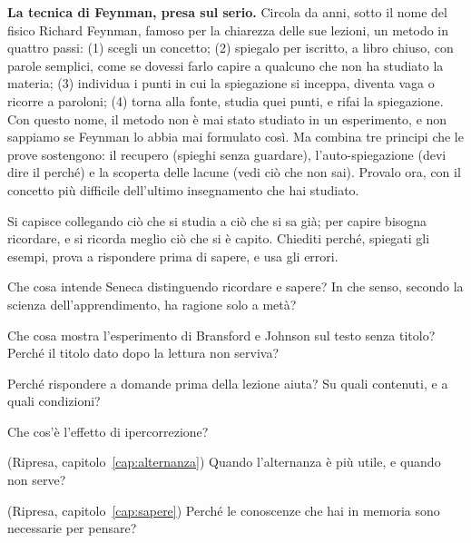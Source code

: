 \begin{esercizio}
\textbf{La tecnica di Feynman, presa sul serio.} Circola da anni, sotto
il nome del fisico Richard Feynman, famoso per la chiarezza delle sue
lezioni, un metodo in quattro passi: (1) scegli un concetto; (2)
spiegalo per iscritto, a libro chiuso, con parole semplici, come se
dovessi farlo capire a qualcuno che non ha studiato la materia; (3)
individua i punti in cui la spiegazione si inceppa, diventa vaga o
ricorre a paroloni; (4) torna alla fonte, studia quei punti, e rifai
la spiegazione. Con questo nome, il metodo non è mai stato studiato in
un esperimento, e non sappiamo se Feynman lo abbia mai formulato così.
Ma combina tre principi che le prove sostengono: il recupero (spieghi
senza guardare), l'auto-spiegazione (devi dire il perché) e la
scoperta delle lacune (vedi ciò che non sai). Provalo ora, con il
concetto più difficile dell'ultimo insegnamento che hai studiato.
\end{esercizio}

\begin{daricordare}
Si capisce collegando ciò che si studia a ciò che si sa già; per
capire bisogna ricordare, e si ricorda meglio ciò che si è capito.
Chiediti perché, spiegati gli esempi, prova a rispondere prima di
sapere, e usa gli errori.
\end{daricordare}

\begin{domande}
  \item Che cosa intende Seneca distinguendo ricordare e sapere? In che
        senso, secondo la scienza dell'apprendimento, ha ragione solo a
        metà?
  \item Che cosa mostra l'esperimento di Bransford e Johnson sul testo
        senza titolo? Perché il titolo dato dopo la lettura non serviva?
  \item Perché rispondere a domande prima della lezione aiuta? Su quali
        contenuti, e a quali condizioni?
  \item Che cos'è l'effetto di ipercorrezione?
  \item (Ripresa, capitolo~\ref{cap:alternanza}) Quando l'alternanza è
        più utile, e quando non serve?
  \item (Ripresa, capitolo~\ref{cap:sapere}) Perché le conoscenze che
        hai in memoria sono necessarie per pensare?
\end{domande}

